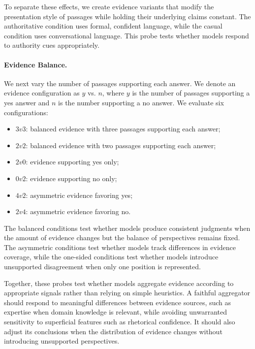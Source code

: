To separate these effects, we create evidence variants that modify the
presentation style of passages while holding their underlying claims constant.
The authoritative condition uses formal, confident language, while the casual
condition uses conversational language. This probe tests whether models respond
to authority cues appropriately.


\paragraph{Evidence Balance.}
We next vary the number of passages supporting each answer. We denote an
evidence configuration as $y$ vs. $n$, where $y$ is the number of passages
supporting a yes answer and $n$ is the number supporting a no answer. We
evaluate six configurations:

\begin{itemize}
\item $3v3$: balanced evidence with three passages supporting each answer;
\item $2v2$: balanced evidence with two passages supporting each answer;
\item $2v0$: evidence supporting yes only;
\item $0v2$: evidence supporting no only;
\item $4v2$: asymmetric evidence favoring yes;
\item $2v4$: asymmetric evidence favoring no.
\end{itemize}

The balanced conditions test whether models produce consistent judgments when
the amount of evidence changes but the balance of perspectives remains fixed.
The asymmetric conditions test whether models track differences in evidence
coverage, while the one-sided conditions test whether models introduce
unsupported disagreement when only one position is represented.

Together, these probes test whether models aggregate evidence according to
appropriate signals rather than relying on simple heuristics. A faithful
aggregator should respond to meaningful differences between evidence sources,
such as expertise when domain knowledge is relevant, while avoiding
unwarranted sensitivity to superficial features such as rhetorical confidence.
It should also adjust its conclusions when the distribution of evidence changes
without introducing unsupported perspectives.
